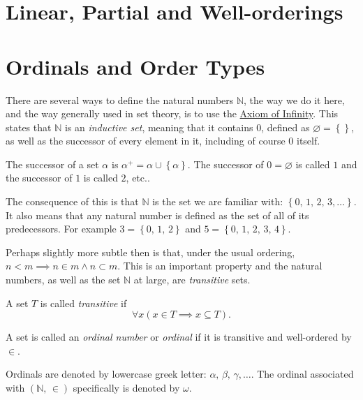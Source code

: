 \documentclass[../../main.tex]{subfiles}
\begin{document}
\section{Linear, Partial and Well-orderings}

\section{Ordinals and Order Types}
There are several ways to define the natural numbers $\mathbb{N}$, the way we do it here, and the way generally used in set theory, is to use the \hyperref[ZF7]{Axiom of Infinity}.
This states that $\mathbb{N}$ is an \textit{inductive set}, meaning that it contains $0$, defined as $\varnothing = \left\{\right\}$, as well as the successor of every element in it, including of course $0$ itself. \cite[p.39]{Gol17}

\begin{definition}\cite[p.38]{Gol17}
    The successor of a set $\alpha$ is $\alpha^+ = \alpha \cup \left\{\alpha\right\}$.
    The successor of $0 = \varnothing$ is called $1$ and the successor of $1$ is called $2$, etc.. 
\end{definition}

The consequence of this is that $\mathbb{N}$ is the set we are familiar with: $\left\{0,\, 1,\, 2,\, 3,\ldots\right\}$.
It also means that any natural number is defined as the set of all of its predecessors.
For example $3 = \left\{0,\, 1,\, 2\right\}$ and $5 = \left\{0,\, 1,\, 2,\, 3,\, 4\right\}$.

Perhaps slightly more subtle then is that, under the usual ordering, $n < m \implies n \in m \wedge n \subset m$.
This is an important property and the natural numbers, as well as the set $\mathbb{N}$ at large, are \textit{transitive} sets.

\begin{definition}\cite[p.14]{Jec78}
    A set $T$ is called \textit{transitive} if $$\forall x \left(x \in T \implies x \subseteq T\right).$$
\end{definition}

\begin{definition}\cite[p.14]{Jec78}
    A set is called an \textit{ordinal number} or \textit{ordinal} if it is transitive and well-ordered by $\in$.
\end{definition}

Ordinals are denoted by lowercase greek letter: $\alpha,\, \beta,\, \gamma,\ldots$.
The ordinal associated with $\left(\mathbb{N},\, \in\right)$ specifically is denoted by $\omega$.
\end{document}

